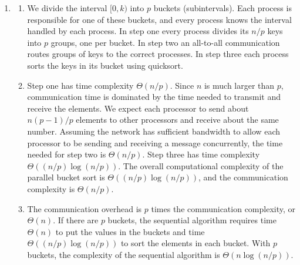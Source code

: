 \begin{enumerate}
\begin{enumerate}
\item Distributing the unsorted subarrays takes $\log p$ steps.
      In the first step 1 process sends $n/2$ values, in the second
      step 2 processes concurrently send $n/4$ values, and so on.
      Hence the communication complexity of this step is $\Theta(\log p + n)$.
      The time needed for each process to sort its section of $n/p$ values is
      $\Theta((n/p)\log(n/p))$.
      The communication time needed for the merge step
      is $\Theta(\log p + n)$.
      The computation time for the merge step is $\Theta(n)$.
      Hence the overall time complexity of parallel mergesort is
      $\Theta(\log p + n + (n/p)\log(n/p))$.

\item The communication overhead of the algorithm is $p$ times the
      communication complexity, or $\Theta(p(\log p + n))$.
      When $n$ is large the message transmission time dominates the
      message latency, so we'll simplify the communication overhead to
      $\Theta(p\log p)$.
      Hence the isoefficiency function is
      $$n\log n \ge Cp\log p$$
      When we double $p$ we must slightly more than double $n$ in order to
      maintain the same level of efficiency.
      Since $p$ is much smaller than $n$, the algorithm is not perfectly
      scalable.
\end{enumerate}

\item
\begin{enumerate}
\item We divide the interval $[0, k)$ into $p$ buckets (subintervals).
      Each process is responsible for one of these buckets, and every process
      knows the interval handled by each process.
      In step one every process divides its $n/p$ keys into $p$ groups,
      one per bucket.
      In step two an all-to-all communication routes groups of keys to the
      correct processes.
      In step three each process sorts the keys in its bucket using quicksort.
\item Step one has time complexity $\Theta(n/p)$.
      Since $n$ is much larger than $p$, communication time is dominated by
      the time needed to transmit and receive the elements.
      We expect each processor to
      send about $n(p-1)/p$ elements to other processors and receive about
      the same number. Assuming the network has sufficient bandwidth to allow
      each processor to be sending and receiving a message concurrently,
      the time needed for step two is $\Theta(n/p)$.
      Step three has time complexity $\Theta((n/p)\log(n/p))$.
      The overall computational complexity of the parallel bucket sort is
      $\Theta((n/p)\log(n/p))$, and the communication complexity is
      $\Theta(n/p)$.
\item The communication overhead is $p$ times the communication complexity,
      or $\Theta(n)$.
      If there are $p$ buckets, the sequential algorithm requires time
      $\Theta(n)$ to put the values in the buckets and time
      $\Theta((n/p)\log(n/p))$ to sort the elements in each bucket.
      With $p$ buckets, the complexity of the sequential algorithm
      is $\Theta(n\log(n/p))$.
     

\end{enumerate}
\end{enumerate}
